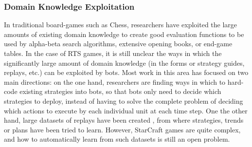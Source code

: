 \documentclass[journal]{IEEEtran}
\begin{document}
\subsubsection{Domain Knowledge Exploitation}
In traditional board-games such as Chess, researchers have exploited the large amounts of existing domain knowledge to create good evaluation functions to be used by alpha-beta search algorithms, extensive opening books, or end-game tables. In the case of RTS games, it is still unclear the ways in which the significantly large amount of domain knowledge (in the forms or strategy guides, replays, etc.) can be exploited by bots. Most work in this area has focused on two main directions: on the one hand, researchers are finding ways in which to hard-code existing strategies into bots, so that bots only need to decide which strategies to deploy, instead of having to solve the complete problem of deciding which actions to execute by each individual unit at each time step. One the other hand, large datasets of replays have been created \cite{WeberCig09, synnaeve2012dataset}, from where strategies, trends or plans have been tried to learn. However, StarCraft games are quite complex, and how to automatically learn from such datasets is still an open problem.
\end{document}

